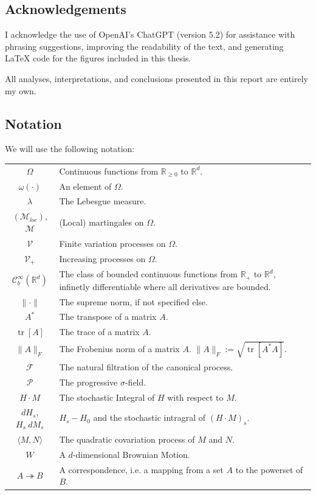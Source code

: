 	\subsection*{Acknowledgements}
I acknowledge the use of OpenAI’s ChatGPT (version 5.2) for assistance with phrasing suggestions, improving the readability of the text, and generating LaTeX code for the figures included in this thesis.

All analyses, interpretations, and conclusions presented in this report are entirely my own.



	\subsection*{Notation}
		\vspace*{-.5cm}
		We will use the following notation: \par
		\begin{table}[H]
			\flushleft
			\begin{tabularx}{\textwidth}{@{}cX@{}}		
				$\Omega$ & Continuous functions from $ \mathbb{R}_{\geq 0}$ to $\mathbb{R}^d $. \\
				$ \omega( \cdot ) $ & An element of $\Omega $. \\
				$ \lambda $ & The Lebesgue measure.\\
				$ (\mathcal{M}_{loc})$, $\mathcal{M} $ & (Local) martingales on $ \Omega $. \\
				$ \mathcal{V}$ & Finite variation processes on $ \Omega $.\\
				$ \mathcal{V}_+$ & Increasing processes on $ \Omega $.\\
				$ \mathcal{C}^{\infty}_b(\mathbb{R}^d)$ & The class of bounded continuous functions from $\mathbb{R}_+$ to $\mathbb{R}^d$, infinetly differentiable where all derivatives are bounded. \\
				$\| \cdot \| $ & The supreme norm, if not specified else. \\
				$ A^* $ & The transpose of a matrix $ A $. \\
				$\operatorname{tr}[ A ] $ & The trace of a matrix $ A $. \\
				$\| A \|_{F} $ & The Frobenius norm of a matrix $ A $. $\| A \|_{F} := \sqrt{\operatorname{tr}[A^* A]}$. \\
				$ \mathcal{F} $ & The natural filtration of the canonical process. \\
				$ \mathcal{P} $ & The progressive $\sigma$-field. \\
				$ H \cdot M $ & The stochastic Integral of $H$ with respect to $ M $. \\
				$ dH_s $, $H_s \ d M_s$ & $H_s - H_0$ and the stochastic intragral of $ (H \cdot M)_s $.\\
				$ \langle M, N \rangle $ & The quadratic covariation process of $ M $ and $ N $. \\
				$ W $ & A $d$-dimensional Brownian Motion. \\
				$ A \twoheadrightarrow B$ & A correspondence, i.e. a mapping from a set $ A $ to the powerset of $ B $.
			\end{tabularx}
		\end{table}
			

